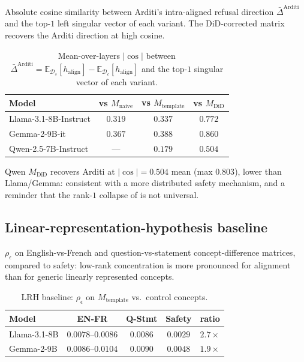 \documentclass[10pt]{article}
\theoremstyle{definition}
\theoremstyle{remark}
\begin{document}
Absolute cosine similarity between Arditi's
intra-aligned refusal direction
$\bar{\Delta}^{\mathrm{Arditi}}$ and the top-$1$ left
singular vector of each variant.  The
DiD-corrected matrix recovers the Arditi direction at
high cosine.

\begin{table}[h]\centering
\caption{Mean-over-layers $|\cos|$ between
$\bar{\Delta}^{\mathrm{Arditi}} =
\mathbb{E}_{\mathcal{D}_s}[h_{\mathrm{align}}] -
\mathbb{E}_{\mathcal{D}_c}[h_{\mathrm{align}}]$ and
the top-$1$ singular vector of each variant.}
\label{tab:arditi_cos}
\begin{tabular}{@{}lccc@{}}
\toprule
Model & vs $M_{\mathrm{naive}}$
      & vs $M_{\mathrm{template}}$
      & vs $M_{\mathrm{DiD}}$ \\
\midrule
Llama-3.1-8B-Instruct & $0.319$ & $0.337$ & $\mathbf{0.772}$ \\
Gemma-2-9B-it         & $0.367$ & $0.388$ & $\mathbf{0.860}$ \\
Qwen-2.5-7B-Instruct  & ---     & $0.179$ & $\mathbf{0.504}$ \\
\bottomrule
\end{tabular}
\end{table}

Qwen $M_{\mathrm{DiD}}$ recovers Arditi at $|\cos| = 0.504$
mean (max $0.803$), lower than Llama/Gemma:
consistent with a more distributed safety mechanism, and
a reminder that the rank-$1$ collapse of \citet{arditi2024refusal}
is not universal.

\subsection{Linear-representation-hypothesis baseline}
\label{app:lrh}

$\rho_{\epsilon}$ on English-vs-French and
question-vs-statement concept-difference matrices,
compared to safety: low-rank concentration is more
pronounced for alignment than for generic linearly
represented concepts.

\begin{table}[h]\centering
\caption{LRH baseline: $\rho_{\epsilon}$ on
$M_{\mathrm{template}}$ vs.\ control concepts.}
\label{tab:lrh_baseline}
\begin{tabular}{@{}lcccc@{}}
\toprule
Model & EN-FR & Q-Stmt & Safety & ratio \\
\midrule
Llama-3.1-8B & $0.0078$--$0.0086$ & $0.0086$ & $0.0029$ & $2.7\times$ \\
Gemma-2-9B   & $0.0086$--$0.0104$ & $0.0090$ & $0.0048$ & $1.9\times$ \\
\bottomrule
\end{tabular}
\end{table}
\end{document}
